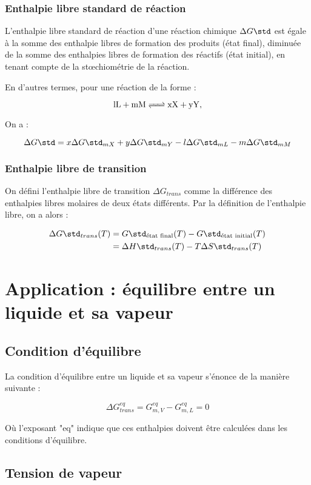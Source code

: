 \subsubsection{Enthalpie libre standard de réaction}
L'enthalpie libre standard de réaction d'une réaction chimique 
$\Delta G\std$ est égale à la somme 
des enthalpie libres de formation des produits (état final),
diminuée de la somme des enthalpies libres de formation des
réactifs (état initial), en tenant compte de la st\oe{}chiométrie de la réaction.

En d'autres termes, pour une réaction de la forme :

$$\ce{lL + mM <=> xX + yY},$$

On a :

$$\Delta G\std = x \Delta G\std_{mX} + y \Delta G\std_{mY} -  l \Delta G\std_{mL} -  
m \Delta G\std_{mM}$$

\subsubsection{Enthalpie libre de transition}
On défini l'enthalpie libre de transition $\Delta G_{trans}$ comme 
la différence des enthalpies libres molaires de deux états différents.
Par la définition de l'enthalpie libre, on a alors :

\begin{align*}
  \Delta G\std_{trans}(T)	&= G\std_{\text{état final}}(T) - G\std_{\text{état initial}}(T)\\
													&= \Delta H\std_{trans}(T) - T\Delta S\std_{trans}(T)
\end{align*}

\section{Application : équilibre entre un liquide et sa vapeur}

\subsection{Condition d'équilibre}
La condition d'équilibre entre un liquide et sa vapeur s'énonce de
la manière suivante : 

$$\Delta G^{eq}_{trans} = G^{eq}_{m, V} - G^{eq}_{m, L} = 0$$

Où l'exposant "eq" indique que ces enthalpies doivent être calculées
dans les conditions d'équilibre.

\subsection{Tension de vapeur}

